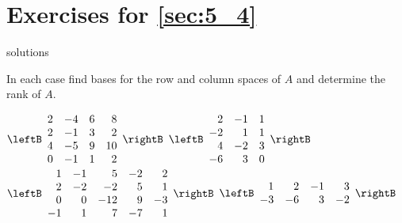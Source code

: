 \section*{Exercises for \ref{sec:5_4}}

\begin{Filesave}{solutions}
\end{Filesave}

\begin{multicols}{2}
\begin{ex}
In each case find bases for the row and column spaces of $A$ and determine the rank of $A$.

\begin{exenumerate}
\exitem
$\leftB \begin{array}{rrrr}
2 & -4 & 6 & 8 \\
2 & -1 & 3 & 2 \\
4 & -5 & 9 & 10\\
0 & -1 & 1 & 2
\end{array} \rightB$
\exitem 
$\leftB \begin{array}{rrr}
2 & -1 & 1 \\
-2 & 1 & 1 \\
4 & -2 & 3 \\
-6 & 3 & 0
\end{array} \rightB$
\exitem*
$\leftB \begin{array}{rrrrr}
1 & -1 & 5 & -2 & 2 \\
2 & -2 & -2 & 5 & 1 \\
0 & 0 & -12 & 9 & -3 \\
-1 & 1 & 7 & -7 & 1
\end{array} \rightB$
\exitem*
$\leftB \begin{array}{rrrr}
1 & 2 & -1 & 3 \\
-3 & -6 & 3 & -2
\end{array} \rightB$
\end{exenumerate}
\begin{sol}
\end{sol}
\end{ex}
\end{multicols}

